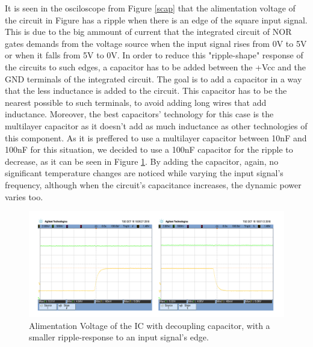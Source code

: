 \documentclass[a4paper,11pt]{report}
\begin{document}
It is seen in the osciloscope from Figure \ref{scap} that the alimentation voltage of the circuit in Figure %
has a ripple when there is an edge of the square input signal. This is due to the big ammount of current that the integrated circuit of NOR gates demands from the voltage source when the input signal rises from 0V to 5V or when it falls from 5V to 0V. 
In order to reduce this "ripple-shape" response of the circuits to such edges, a capacitor has to be added between the +Vcc and the GND terminals of the integrated circuit. The goal is to add a capacitor in a way that the less inductance is added to the circuit. This capacitor has to be the nearest possible to such terminals, to avoid adding long wires that add inductance. Moreover,  the best capacitors' technology for this case is the multilayer capacitor as it doesn't add as much inductance as other technologies of this component. As it is preffered to use a multilayer capacitor between 10nF and 100nF for this situation, we decided to use a 100nF capacitor for the ripple to decrease, as it can be seen in Figure \ref{ccap}. By adding the capacitor, again, no significant temperature changes are noticed while varying the input signal's frequency, although when the circuit's capacitance increases, the dynamic power varies too.

\begin{figure}[h!]
\centering
\includegraphics[scale=0.7]{../Exercise4/ccap}
\caption{Alimentation Voltage of the IC with decoupling capacitor, with a smaller ripple-response to an input signal's edge.}
\label{ccap}
\end{figure}
\end{document}

